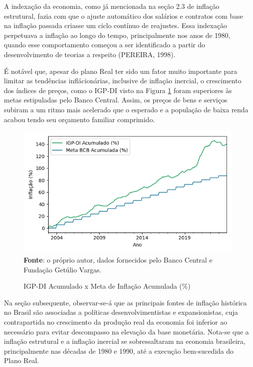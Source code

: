 \documentclass[12pt,oneside,a4paper,chapter=TITLE,english,brazil,sumario=abnt-6027-2012]{abntex2}
\begin{document}
A indexação da economia, como já mencionada na seção 2.3 de inflação estrutural, fazia com que o ajuste automático dos salários e contratos com base na inflação passada criasse um ciclo contínuo de reajustes. Essa indexação perpetuava a inflação ao longo do tempo, principalmente nos anos de 1980, quando esse comportamento começou a ser identificado a partir do desenvolvimento de teorias a respeito (PEREIRA, 1998).

É notável que, apesar do plano Real ter sido um fator muito importante para limitar as tendências inflácionárias, inclusive de inflação	inercial, o crescimento dos índices de preços, como o IGP-DI visto na Figura \ref{fig:igpdiacum} foram superiores às metas estipuladas pelo Banco Central. Assim, os preços de bens e serviços subiram a um ritmo mais acelerado que o esperado e a população de baixa renda acabou tendo seu orçamento familiar comprimido.

\begin{figure}[H]
	
	\caption{IGP-DI Acumulado x Meta de Inflação Acumulada (\%)}
	
	\includegraphics[]{fig/igpdi_96_24_t.png}\\
	\footnotesize{\textbf{Fonte}: o próprio autor, dados fornecidos pelo Banco Central e Fundação Getúlio Vargas.}
	\label{fig:igpdiacum}
\end{figure}

Na seção subsequente, observar-se-á que as principais fontes de inflação histórica no Brasil são associadas a políticas desenvolvimentistas e expansionistas, cuja contrapartida no crescimento da produção real da economia foi inferior ao necessário para evitar descompasso na elevação da base monetária. Nota-se que a inflação estrutural e a inflação inercial se sobressaltaram na economia brasileira, principalmente nas décadas de 1980 e 1990, até a execução bem-sucedida do Plano Real.
\end{document}
